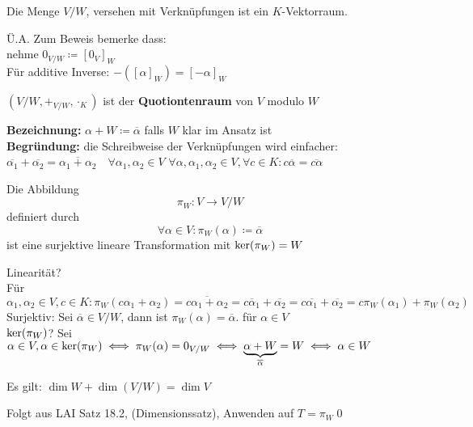 \begin{subtheorem}
	Die Menge $ V / W $, versehen mit Verknüpfungen ist ein $ K $-Vektorraum.
\end{subtheorem}

\begin{subproof}
	Ü.A. Zum Beweis bemerke dass:\\
	nehme $ 0_{V / W} \coloneqq [0_V]_W $\\
	Für additive Inverse: $ -\left( [\alpha]_W \right) = [-\alpha]_W $
\end{subproof}

\begin{subdefinition*}
	$ (V / W, +_{V / W} , \cdot _K) $ ist der \textbf{Quotiontenraum} von $ V $ modulo $ W $ 
\end{subdefinition*}

\textbf{Bezeichnung:} $ \alpha + W \coloneqq \overline{\alpha}  $ falls $ W $ klar im Ansatz ist\\
\textbf{Begründung:} die Schreibweise der Verknüpfungen wird einfacher: $ \overline{\alpha_1} + \overline{\alpha_2} = \overline{\alpha_1 + \alpha_2} \quad \forall \alpha_1, \alpha_2 \in V $
$ \forall \alpha, \alpha_1, \alpha_2 \in V, \forall c \in K: c \overline{\alpha} = \overline{c\alpha}  $

\begin{subtheorem}
	Die Abbildung
	\[
		\pi _W : V \to V / W
	\]
	definiert durch 
	\[
		\forall \alpha \in V : \pi _W(\alpha) \coloneqq  \overline{\alpha} 
	\]
	ist eine surjektive lineare Transformation mit $ \operatorname{ker}(\pi _W) = W $
\end{subtheorem}
\begin{subproof*}
	Linearität?\\
	Für $ \alpha_1, \alpha_2 \in V, c \in K: \pi _W(c\alpha_1 + \alpha_2) = \overline{c\alpha_1 + \alpha_2} = \overline{c\alpha_1} + \overline{\alpha_2} = c \overline{\alpha_1} + \overline{\alpha_2} = c \pi _W(\alpha_1) + \pi _W(\alpha_2) $\\
	Surjektiv: Sei $ \overline{\alpha} \in V / W $, dann ist $ \pi _W(\alpha) = \overline{\alpha}  $. für $ \alpha \in V $\\
	$ \operatorname{ker}(\pi _W) $? Sei $ \alpha \in V, \alpha \in \operatorname{ker}(\pi _W) \iff \pi _W(\alpha) = 0_{V / W} \iff \underbrace{\alpha + W}_{\overline{\alpha} } = W \iff \alpha \in W $
\end{subproof*}

\begin{subcorollary}
	Es gilt: $ \dim W + \dim ( V / W ) = \dim V $
\end{subcorollary}
\begin{subproof*}
	Folgt aus LAI Satz 18.2, (Dimensionssatz), Anwenden auf $ T = \pi _W $\qed
\end{subproof*}

